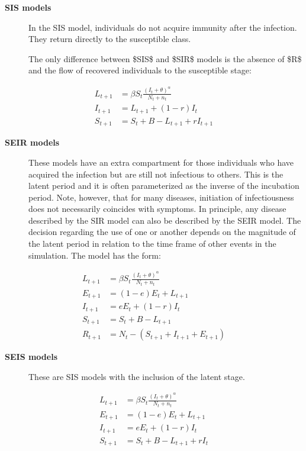 \documentclass[a4paper,10pt,english]{sphinxmanual}
\begin{document}
\begin{description}
\item[{\textbf{SIS models}}] \leavevmode
In the SIS model, individuals do not acquire immunity after the infection. They return directly to the susceptible class.

The only difference between \$SIS\$ and \$SIR\$ models is the absence of \$R\$ and the flow of recovered individuals to the susceptible stage:

\end{description}
\label{intromodels:equation-E:SISmodel}\begin{align}
        L_{t+1} &= \beta S_t \frac{(I_t+\theta)^\alpha} {N_t+n_t} \nonumber\\
        I_{t+1} &= L_{t+1} + (1-r)I_t\nonumber\\
        S_{t+1} &= S_t + B - L_{t+1} + r I_{t+1}\nonumber
\end{align}
\begin{description}
\item[{\textbf{SEIR models}}] \leavevmode
These models have an extra compartment for those individuals who have acquired the infection but are still not infectious to others. This is the latent period and it is often parameterized as the inverse of the incubation period. Note, however, that for many diseases, initiation of infectiousness does not necessarily coincides with symptoms. In principle, any disease described by the SIR model can also be described by the SEIR model. The decision regarding the use of one or another depends on the magnitude of the latent period in relation to the time frame of other events in the simulation. The model has the form:

\end{description}
\label{intromodels:equation-E:SEIRmodel}\begin{align}
        L_{t+1} &= \beta S_t \frac{(I_t+\theta)^\alpha} {N_t+n_t}\nonumber \\
    E_{t+1} &= (1-e) E_t + L_{t+1}\nonumber\\
        I_{t+1} &= e E_t + (1-r)I_t\nonumber\\
        S_{t+1} &= S_t + B - L_{t+1}\nonumber\\
        R_{t+1} &= N_t-(S_{t+1}+I_{t+1}+E_{t+1})\nonumber
\end{align}
\begin{description}
\item[{\textbf{SEIS models}}] \leavevmode
These are SIS models with the inclusion of the latent stage.

\end{description}
\label{intromodels:equation-E:SEISmodel}\begin{align}
        L_{t+1} &= \beta S_t \frac{(I_t+\theta)^\alpha} {N_t+n_t}\nonumber \\
    E_{t+1} &= (1-e) E_t + L_{t+1}\nonumber\\
        I_{t+1} &= e E_t + (1-r)I_t\nonumber\\
        S_{t+1} &= S_t + B - L_{t+1} + r I_t\nonumber
\end{align}
\end{document}
